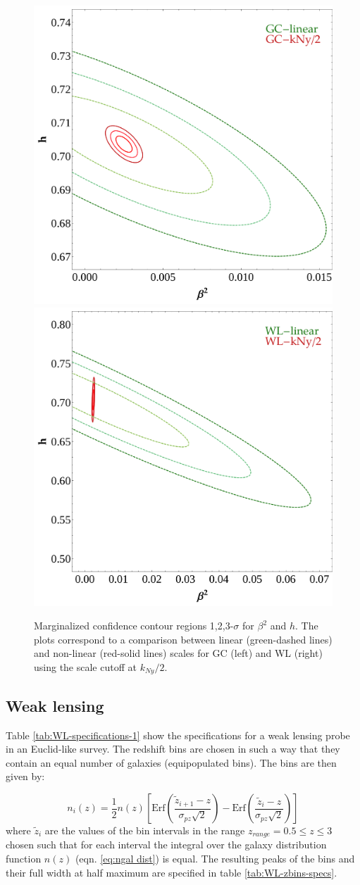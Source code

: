 \begin{figure}
\centering{}\includegraphics[height=0.45\textwidth]{Chapters/fitting-funcs/figures/GC-linear-vs-PkCut-1p1-kNy-margedContours-h-beta}
\includegraphics[height=0.45\textwidth]{Chapters/fitting-funcs/figures/WL-linear-vs-PkCut-1p1-kNy-margedContours-h-beta}
\caption[Fisher confidence contour regions
for $\beta^{2}$ and $h$ in CDE using GC and WL surveys.]{\label{fig:Contour-scale} Marginalized confidence contour regions
1,2,3-$\sigma$ for $\beta^{2}$ and $h$. The plots correspond to
a comparison between linear (green-dashed lines) and non-linear (red-solid
lines) scales for GC (left) and WL (right) using the scale cutoff
at $k_{Ny}/2$. }
\end{figure}



\subsection{Weak lensing}

Table \ref{tab:WL-specifications-1} show the specifications for a
weak lensing probe in an Euclid-like survey. The redshift bins are
chosen in such a way that they contain an equal number of galaxies
(equipopulated bins). The bins are then given by:

\begin{equation}
n_{i}(z)=\frac{1}{2}n(z)\left[\mbox{Erf}\left(\frac{\tilde{z}_{i+1}-z}{\sigma_{pz}\sqrt{2}}\right)-\mbox{Erf}\left(\frac{\tilde{z}_{i}-z}{\sigma_{pz}\sqrt{2}}\right)\right]
\end{equation}
where $\tilde{z}_{i}$ are the values of the bin intervals in the
range $z_{range}=0.5\leq z\leq3$ chosen such that for each interval
the integral over the galaxy distribution function $n(z)$ (eqn. \ref{eq:ngal dist})
is equal. The resulting peaks of the bins and their full width at
half maximum are specified in table \ref{tab:WL-zbins-specs}.

